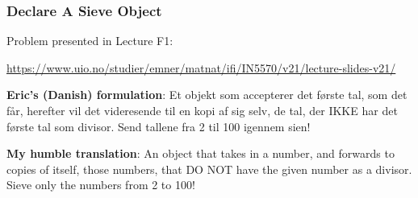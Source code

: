 \begin{frame}

\frametitle{Declare A Sieve Object}

\vspace{\fill}

Problem presented in Lecture F1:

\url{https://www.uio.no/studier/emner/matnat/ifi/IN5570/v21/lecture-slides-v21/}

\vspace{\fill}

\textbf{Eric's (Danish) formulation}: Et objekt som accepterer det
første tal, som det får, herefter vil det videresende til en kopi af
sig selv, de tal, der IKKE har det første tal som divisor. Send
tallene fra 2 til 100 igennem sien!

\vspace{\fill}

\textbf{My humble translation}: An object that takes in a number, and
forwards to copies of itself, those numbers, that DO NOT have the
given number as a divisor. Sieve only the numbers from 2 to 100!

\vspace{\fill}

\end{frame}
